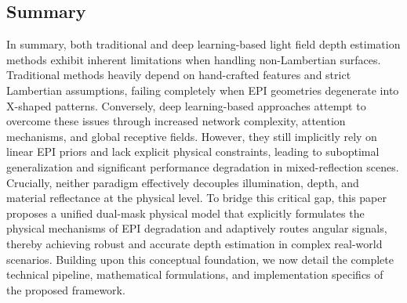\subsection{Summary}

In summary, both traditional and deep learning-based light field depth estimation methods exhibit inherent limitations when handling non-Lambertian surfaces. Traditional methods heavily depend on hand-crafted features and strict Lambertian assumptions, failing completely when EPI geometries degenerate into X-shaped patterns. Conversely, deep learning-based approaches attempt to overcome these issues through increased network complexity, attention mechanisms, and global receptive fields. However, they still implicitly rely on linear EPI priors and lack explicit physical constraints, leading to suboptimal generalization and significant performance degradation in mixed-reflection scenes. Crucially, neither paradigm effectively decouples illumination, depth, and material reflectance at the physical level. To bridge this critical gap, this paper proposes a unified dual-mask physical model that explicitly formulates the physical mechanisms of EPI degradation and adaptively routes angular signals, thereby achieving robust and accurate depth estimation in complex real-world scenarios. Building upon this conceptual foundation, we now detail the complete technical pipeline, mathematical formulations, and implementation specifics of the proposed framework.